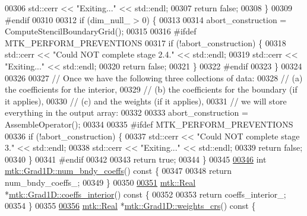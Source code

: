 \begin{DoxyCode}
{{00306     std::cerr << \textcolor{stringliteral}{"Exiting..."} << std::endl;
00307     \textcolor{keywordflow}{return} \textcolor{keyword}{false};
00308   \}
00309 \textcolor{preprocessor}{  #endif}
00310 
00312   \textcolor{keywordflow}{if} (dim\_null\_ > 0) \{
00313 
00314     abort\_construction = ComputeStencilBoundaryGrid();
00315 
00316 \textcolor{preprocessor}{    #ifdef MTK\_PERFORM\_PREVENTIONS}
00317     \textcolor{keywordflow}{if} (!abort\_construction) \{
00318       std::cerr << \textcolor{stringliteral}{"Could NOT complete stage 2.4."} << std::endl;
00319       std::cerr << \textcolor{stringliteral}{"Exiting..."} << std::endl;
00320       \textcolor{keywordflow}{return} \textcolor{keyword}{false};
00321     \}
00322 \textcolor{preprocessor}{    #endif}
00323   \}
00324 
00326 
00327   \textcolor{comment}{// Once we have the following three collections of data:}
00328   \textcolor{comment}{//   (a) the coefficients for the interior,}
00329   \textcolor{comment}{//   (b) the coefficients for the boundary (if it applies),}
00330   \textcolor{comment}{//   (c) and the weights (if it applies),}
00331   \textcolor{comment}{// we will store everything in the output array:}
00332 
00333   abort\_construction = AssembleOperator();
00334 
00335 \textcolor{preprocessor}{  #ifdef MTK\_PERFORM\_PREVENTIONS}
00336   \textcolor{keywordflow}{if} (!abort\_construction) \{
00337     std::cerr << \textcolor{stringliteral}{"Could NOT complete stage 3."} << std::endl;
00338     std::cerr << \textcolor{stringliteral}{"Exiting..."} << std::endl;
00339     \textcolor{keywordflow}{return} \textcolor{keyword}{false};
00340   \}
00341 \textcolor{preprocessor}{  #endif}
00342 
00343   \textcolor{keywordflow}{return} \textcolor{keyword}{true};
00344 \}
00345 
\hypertarget{mtk__grad__1d_8cc_source_l00346}{}\hyperlink{classmtk_1_1Grad1D_a7168205c21ba00012558f8bba069c119}{00346} \textcolor{keywordtype}{int} \hyperlink{classmtk_1_1Grad1D_a7168205c21ba00012558f8bba069c119}{mtk::Grad1D::num\_bndy\_coeffs}()\textcolor{keyword}{ const }\{
00347 
00348   \textcolor{keywordflow}{return} num\_bndy\_coeffs\_;
00349 \}
00350 
\hypertarget{mtk__grad__1d_8cc_source_l00351}{}\hyperlink{classmtk_1_1Grad1D_a88735f8d2a6ed986370dc3caeb84959b}{00351} \hyperlink{group__c01-roots_gac080bbbf5cbb5502c9f00405f894857d}{mtk::Real} *\hyperlink{classmtk_1_1Grad1D_a88735f8d2a6ed986370dc3caeb84959b}{mtk::Grad1D::coeffs\_interior}()\textcolor{keyword}{ const }\{
00352 
00353   \textcolor{keywordflow}{return} coeffs\_interior\_;
00354 \}
00355 
\hypertarget{mtk__grad__1d_8cc_source_l00356}{}\hyperlink{classmtk_1_1Grad1D_ae5f15d8986a5680b6a1c120283c6cc5e}{00356} \hyperlink{group__c01-roots_gac080bbbf5cbb5502c9f00405f894857d}{mtk::Real} *\hyperlink{classmtk_1_1Grad1D_ae5f15d8986a5680b6a1c120283c6cc5e}{mtk::Grad1D::weights\_crs}()\textcolor{keyword}{ const }\{
}}
\end{DoxyCode}
